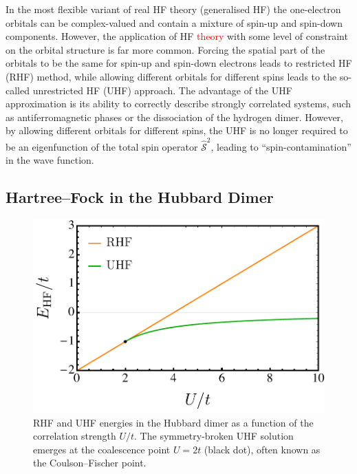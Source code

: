 \documentclass[aps,prb,reprint,noshowkeys,superscriptaddress]{revtex4-1}
\newcommand{\titou}[1]{\textcolor{red}{#1}}
\begin{document}
In the most flexible variant of real HF theory (generalised HF) the one-electron orbitals can be complex-valued
and contain a mixture of spin-up and spin-down components.\cite{Mayer_1993,Jimenez-Hoyos_2011}
However, the application of HF \titou{theory} with some level of constraint on the orbital structure is far more common.
Forcing the spatial part of the orbitals to be the same for spin-up and spin-down electrons leads to restricted HF (RHF) method, 
while allowing different orbitals for different spins leads to the so-called unrestricted HF (UHF) approach.\cite{StuberPaldus}
The advantage of the UHF approximation is its ability to correctly describe strongly correlated systems, 
such as antiferromagnetic phases\cite{Slater_1951} or the dissociation of the hydrogen dimer.\cite{Coulson_1949}
However, by allowing different orbitals for different spins, the UHF is no longer required to be an eigenfunction of 
the total spin operator $\hat{\mathcal{S}}^2$, leading to ``spin-contamination'' in the wave function.

\subsection{Hartree--Fock in the Hubbard Dimer}
\label{sec:HF_hubbard}

\begin{figure}
    \includegraphics[width=\linewidth]{fig2}
    \caption{\label{fig:HF_real}
    RHF and UHF energies in the Hubbard dimer as a function of the correlation strength $U/t$. 
    The symmetry-broken UHF solution emerges at the coalescence point $U=2t$ (black dot), often known as the Coulson--Fischer point.}
\end{figure}
\end{document}
